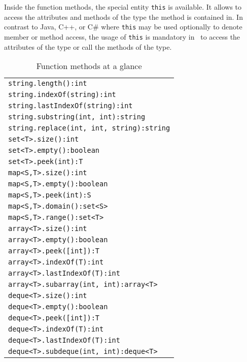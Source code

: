 Inside the function methods, the special entity \texttt{this} is available.
It allows to access the attributes and methods of the type the method is contained in.
In contrast to Java, C++, or C\# where \texttt{this} may be used optionally to denote member or method access,
the usage of \texttt{this} is mandatory in \GrG~to access the attributes of the type or call the methods of the type.

\begin{table}[htbp]
\centering
\begin{tabular}{|l|}
\hline
\texttt{string.length():int}\\
\texttt{string.indexOf(string):int}\\
\texttt{string.lastIndexOf(string):int}\\
\texttt{string.substring(int, int):string}\\
\texttt{string.replace(int, int, string):string}\\
\hline
\texttt{set<T>.size():int}\\
\texttt{set<T>.empty():boolean}\\
\texttt{set<T>.peek(int):T}\\
\hline
\texttt{map<S,T>.size():int}\\
\texttt{map<S,T>.empty():boolean}\\
\texttt{map<S,T>.peek(int):S}\\
\texttt{map<S,T>.domain():set<S>}\\
\texttt{map<S,T>.range():set<T>}\\
\hline
\texttt{array<T>.size():int}\\
\texttt{array<T>.empty():boolean}\\
\texttt{array<T>.peek([int]):T}\\
\texttt{array<T>.indexOf(T):int}\\
\texttt{array<T>.lastIndexOf(T):int}\\
\texttt{array<T>.subarray(int, int):array<T>}\\
\hline
\texttt{deque<T>.size():int}\\
\texttt{deque<T>.empty():boolean}\\
\texttt{deque<T>.peek([int]):T}\\
\texttt{deque<T>.indexOf(T):int}\\
\texttt{deque<T>.lastIndexOf(T):int}\\
\texttt{deque<T>.subdeque(int, int):deque<T>}\\
\hline
\end{tabular}
\caption{Function methods at a glance}
\label{funcmethstab}
\end{table}

